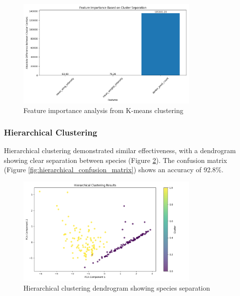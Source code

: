 \documentclass[a4paper,12pt]{report}
\begin{document}
\begin{figure}[H]
    \centering
    \includegraphics[width=0.8\textwidth]{images/clustering/kmeans_feature_importance.png}
    \caption{Feature importance analysis from K-means clustering}
    \label{fig:kmeans_feature_importance}
\end{figure}

\subsubsection{Hierarchical Clustering}
Hierarchical clustering demonstrated similar effectiveness, with a dendrogram showing clear separation between species (Figure \ref{fig:hierarchical_clustering}). The confusion matrix (Figure \ref{fig:hierarchical_confusion_matrix}) shows an accuracy of 92.8\%.

\begin{figure}[H]
    \centering
    \includegraphics[width=0.8\textwidth]{images/clustering/hierarchical_clustering.png}
    \caption{Hierarchical clustering dendrogram showing species separation}
    \label{fig:hierarchical_clustering}
\end{figure}
\end{document}
